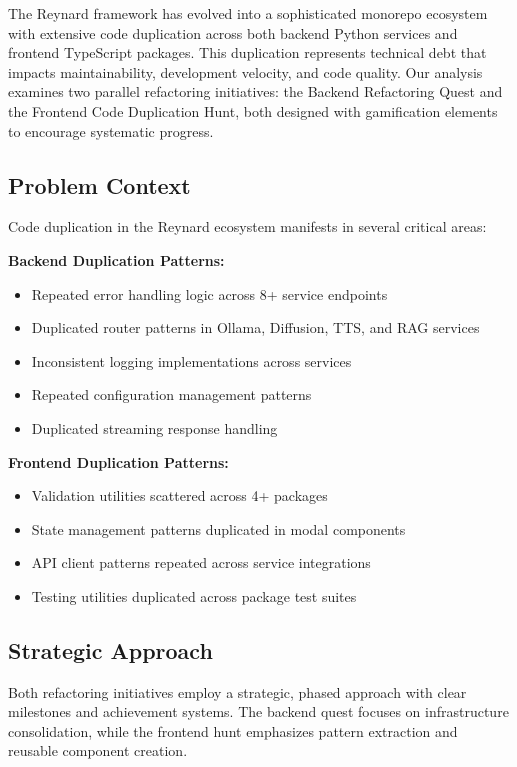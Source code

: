 \documentclass[10pt]{article}
\begin{document}
The Reynard framework has evolved into a sophisticated monorepo ecosystem with extensive code duplication across both backend Python services and frontend TypeScript packages. This duplication represents technical debt that impacts maintainability, development velocity, and code quality. Our analysis examines two parallel refactoring initiatives: the Backend Refactoring Quest and the Frontend Code Duplication Hunt, both designed with gamification elements to encourage systematic progress.

\subsection{Problem Context}

Code duplication in the Reynard ecosystem manifests in several critical areas:

\textbf{Backend Duplication Patterns:}
\begin{itemize}
    \item Repeated error handling logic across 8+ service endpoints
    \item Duplicated router patterns in Ollama, Diffusion, TTS, and RAG services
    \item Inconsistent logging implementations across services
    \item Repeated configuration management patterns
    \item Duplicated streaming response handling
\end{itemize}

\textbf{Frontend Duplication Patterns:}
\begin{itemize}
    \item Validation utilities scattered across 4+ packages
    \item State management patterns duplicated in modal components
    \item API client patterns repeated across service integrations
    \item Testing utilities duplicated across package test suites
\end{itemize}

\subsection{Strategic Approach}

Both refactoring initiatives employ a strategic, phased approach with clear milestones and achievement systems. The backend quest focuses on infrastructure consolidation, while the frontend hunt emphasizes pattern extraction and reusable component creation.
\end{document}
